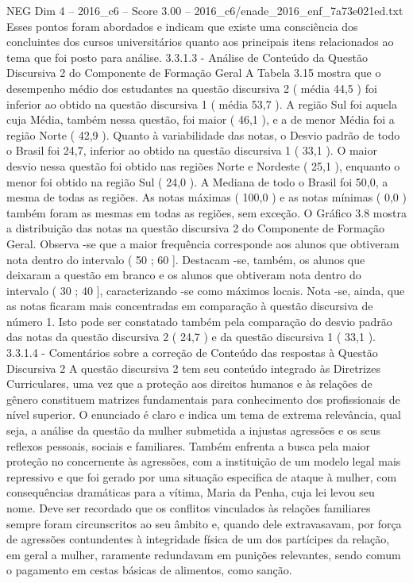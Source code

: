 \begin{textsample}{NEG Dim 4 – 2016\_c6 – Score 3.00 – 2016\_c6/enade\_2016\_enf\_7a73e021ed.txt}
Esses pontos foram abordados e indicam que existe uma consciência dos concluintes dos cursos universitários quanto aos principais itens relacionados ao tema que foi posto para análise. 3.3.1.3 - Análise de Conteúdo da Questão Discursiva 2 do Componente de Formação Geral A Tabela 3.15 mostra que o desempenho médio dos estudantes na questão discursiva 2 ( média 44,5 ) foi inferior ao obtido na questão discursiva 1 ( média 53,7 ).
A região Sul foi aquela cuja Média, também nessa questão, foi maior ( 46,1 ), e a de menor Média foi a região Norte ( 42,9 ).
Quanto à variabilidade das notas, o Desvio padrão de todo o Brasil foi 24,7, inferior ao obtido na questão discursiva 1 ( 33,1 ).
O maior desvio nessa questão foi obtido nas regiões Norte e Nordeste ( 25,1 ), enquanto o menor foi obtido na região Sul ( 24,0 ).
A Mediana de todo o Brasil foi 50,0, a mesma de todas as regiões.
As notas máximas ( 100,0 ) e as notas mínimas ( 0,0 ) também foram as mesmas em todas as regiões, sem exceção.
O Gráfico 3.8 mostra a distribuição das notas na questão discursiva 2 do Componente de Formação Geral.
Observa -se que a maior frequência corresponde aos alunos que obtiveram nota dentro do intervalo ( 50 ; 60 ].
Destacam -se, também, os alunos que deixaram a questão em branco e os alunos que obtiveram nota dentro do intervalo ( 30 ; 40 ], caracterizando -se como máximos locais.
Nota -se, ainda, que as notas ficaram mais concentradas em comparação à questão discursiva de número 1.
Isto pode ser constatado também pela comparação do desvio padrão das notas da questão discursiva 2 ( 24,7 ) e da questão discursiva 1 ( 33,1 ). 3.3.1.4 - Comentários sobre a correção de Conteúdo das respostas à Questão Discursiva 2 A questão discursiva 2 tem seu conteúdo integrado às Diretrizes Curriculares, uma vez que a proteção aos direitos humanos e às relações de gênero constituem matrizes fundamentais para conhecimento dos profissionais de nível superior.
O enunciado é claro e indica um tema de extrema relevância, qual seja, a análise da questão da mulher submetida a injustas agressões e os seus reflexos pessoais, sociais e familiares.
Também enfrenta a busca pela maior proteção no concernente às agressões, com a instituição de um modelo legal mais repressivo e que foi gerado por uma situação especifica de ataque à mulher, com consequências dramáticas para a vítima, Maria da Penha, cuja lei levou seu nome.
Deve ser recordado que os conflitos vinculados às relações familiares sempre foram circunscritos ao seu âmbito e, quando dele extravasavam, por força de agressões contundentes à integridade física de um dos partícipes da relação, em geral a mulher, raramente redundavam em punições relevantes, sendo comum o pagamento em cestas básicas de alimentos, como sanção.

\end{textsample}
